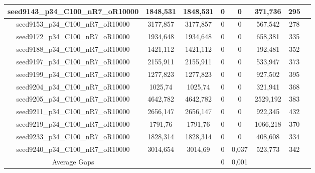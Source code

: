 \documentclass[a4paper]{article}
\begin{document}
\begin{center}
\begin{longtable}{cccccccc}
\hline
seed9143\_p34\_C100\_nR7\_oR10000 & 1848,531 & 1848,531 & 0 & 0 & 371,736 & 295\\
\hline
seed9153\_p34\_C100\_nR7\_oR10000 & 3177,857 & 3177,857 & 0 & 0 & 567,542 & 278\\
\hline
seed9172\_p34\_C100\_nR7\_oR10000 & 1934,648 & 1934,648 & 0 & 0 & 658,381 & 335\\
\hline
seed9188\_p34\_C100\_nR7\_oR10000 & 1421,112 & 1421,112 & 0 & 0 & 192,481 & 352\\
\hline
seed9197\_p34\_C100\_nR7\_oR10000 & 2155,911 & 2155,911 & 0 & 0 & 533,947 & 373\\
\hline
seed9199\_p34\_C100\_nR7\_oR10000 & 1277,823 & 1277,823 & 0 & 0 & 927,502 & 395\\
\hline
seed9204\_p34\_C100\_nR7\_oR10000 & 1025,74 & 1025,74 & 0 & 0 & 321,941 & 368\\
\hline
seed9205\_p34\_C100\_nR7\_oR10000 & 4642,782 & 4642,782 & 0 & 0 & 2529,192 & 383\\
\hline
seed9211\_p34\_C100\_nR7\_oR10000 & 2656,147 & 2656,147 & 0 & 0 & 922,345 & 432\\
\hline
seed9219\_p34\_C100\_nR7\_oR10000 & 1791,76 & 1791,76 & 0 & 0 & 1066,218 & 370\\
\hline
seed9233\_p34\_C100\_nR7\_oR10000 & 1828,314 & 1828,314 & 0 & 0 & 408,608 & 334\\
\hline
seed9240\_p34\_C100\_nR7\_oR10000 & 3014,654 & 3014,69 & 0 & 0,037 & 523,773 & 342\\
\hline
\hline
Average Gaps & & & 0 & 0,001 & & \\
\hline
\hline
\end{longtable}
\end{center}
\end{document}
